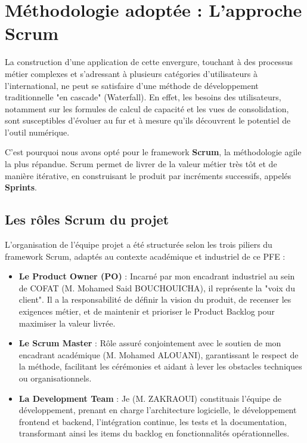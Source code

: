 \section{Méthodologie adoptée : L'approche Scrum}
La construction d'une application de cette envergure, touchant à des processus métier complexes et s'adressant à plusieurs catégories d'utilisateurs à l'international, ne peut se satisfaire d'une méthode de développement traditionnelle "en cascade" (Waterfall). En effet, les besoins des utilisateurs, notamment sur les formules de calcul de capacité et les vues de consolidation, sont susceptibles d'évoluer au fur et à mesure qu'ils découvrent le potentiel de l'outil numérique.

C'est pourquoi nous avons opté pour le framework \textbf{Scrum}, la méthodologie agile la plus répandue. Scrum permet de livrer de la valeur métier très tôt et de manière itérative, en construisant le produit par incréments successifs, appelés \textbf{Sprints}. 

\subsection{Les rôles Scrum du projet}
L'organisation de l'équipe projet a été structurée selon les trois piliers du framework Scrum, adaptés au contexte académique et industriel de ce PFE :
\begin{itemize}
    \item \textbf{Le Product Owner (PO)} : Incarné par mon encadrant industriel au sein de COFAT (M. Mohamed Said BOUCHOUICHA), il représente la "voix du client". Il a la responsabilité de définir la vision du produit, de recenser les exigences métier, et de maintenir et prioriser le Product Backlog pour maximiser la valeur livrée.
    \item \textbf{Le Scrum Master} : Rôle assuré conjointement avec le soutien de mon encadrant académique (M. Mohamed ALOUANI), garantissant le respect de la méthode, facilitant les cérémonies et aidant à lever les obstacles techniques ou organisationnels.
    \item \textbf{La Development Team} : Je (M. ZAKRAOUI) constituais l'équipe de développement, prenant en charge l'architecture logicielle, le développement frontend et backend, l'intégration continue, les tests et la documentation, transformant ainsi les items du backlog en fonctionnalités opérationnelles.
\end{itemize}

